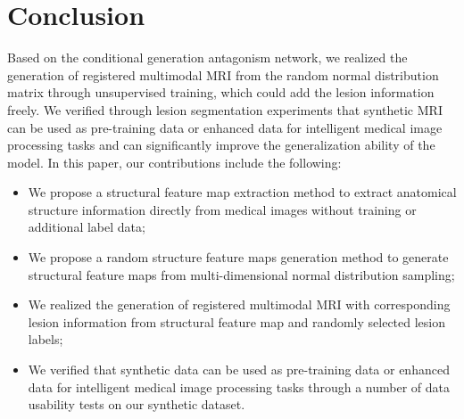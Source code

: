 \documentclass[letterpaper]{article} %
\begin{document}
%

\section{Conclusion}
Based on the conditional generation antagonism network, we realized the generation of registered multimodal MRI from the random normal distribution matrix through unsupervised training, which could add the lesion information freely. 
We verified through lesion segmentation experiments that synthetic MRI can be used as pre-training data or enhanced data for intelligent medical image processing tasks and can significantly improve the generalization ability of the model.
In this paper, our contributions include the following:
\begin{itemize}
	\item We propose a structural feature map extraction method to extract anatomical structure information directly from medical images without training or additional label data;
	\item We propose a random structure feature maps generation method to generate structural feature maps from multi-dimensional normal distribution sampling;
	\item We realized the generation of registered multimodal MRI with corresponding lesion information from structural feature map and randomly selected lesion labels;
	\item We verified that synthetic data can be used as pre-training data or enhanced data for intelligent medical image processing tasks through a number of data usability tests on our synthetic dataset.
	
\end{itemize}
\end{document}
